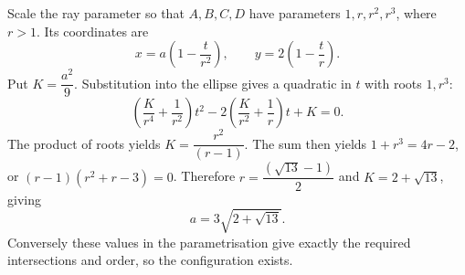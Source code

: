 Scale the ray parameter so that $A,B,C,D$ have parameters $1,r,r^2,r^3$, where $r>1$. Its coordinates are
\[
x=a(1-\dfrac{t}{r^2}),\qquad y=2(1-\dfrac{t}{r}).
\]
Put $K=\dfrac{a^2}{9}$. Substitution into the ellipse gives a quadratic in $t$ with roots $1,r^3$:
\[
\left(\dfrac{K}{r^4}+\dfrac{1}{r^2}\right)t^2
-2\left(\dfrac{K}{r^2}+\dfrac{1}{r}\right)t+K=0.
\]
The product of roots yields $K=\dfrac{r^2}{(r-1)}$. The sum then yields $1+r^3=4r-2$, or $(r-1)(r^2+r-3)=0$. Therefore $r=\dfrac{(\sqrt{13}-1)}{2}$ and $K=2+\sqrt{13}$, giving
\[
\boxed{a=3\sqrt{2+\sqrt{13}}}.
\]
Conversely these values in the parametrisation give exactly the required intersections and order, so the configuration exists.
